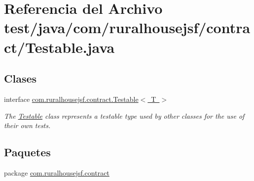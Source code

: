 \hypertarget{a00089}{}\section{Referencia del Archivo test/java/com/ruralhousejsf/contract/\+Testable.java}
\label{a00089}
\subsection*{Clases}
\begin{DoxyCompactItemize}
\item 
interface \mbox{\hyperlink{a00244}{com.\+ruralhousejsf.\+contract.\+Testable$<$ T $>$}}
\begin{DoxyCompactList}\small\item\em The \mbox{\hyperlink{a00244}{Testable}} class represents a testable type used by other classes for the use of their own tests. \end{DoxyCompactList}\end{DoxyCompactItemize}
\subsection*{Paquetes}
\begin{DoxyCompactItemize}
\item 
package \mbox{\hyperlink{a00123}{com.\+ruralhousejsf.\+contract}}
\end{DoxyCompactItemize}
